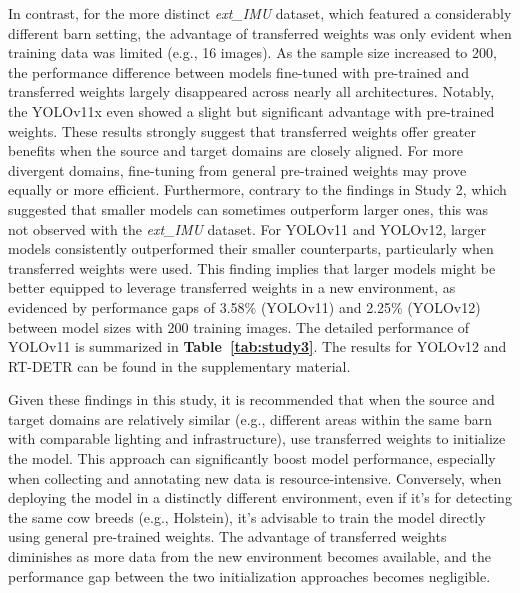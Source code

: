 In contrast, for the more distinct \textit{ext\_IMU} dataset, which featured a considerably different barn setting, the advantage of transferred weights was only evident when training data was limited (e.g., 16 images). As the sample size increased to 200, the performance difference between models fine-tuned with pre-trained and transferred weights largely disappeared across nearly all architectures. Notably, the YOLOv11x even showed a slight but significant advantage with pre-trained weights. These results strongly suggest that transferred weights offer greater benefits when the source and target domains are closely aligned. For more divergent domains, fine-tuning from general pre-trained weights may prove equally or more efficient. Furthermore, contrary to the findings in Study 2, which suggested that smaller models can sometimes outperform larger ones, this was not observed with the \textit{ext\_IMU} dataset. For YOLOv11 and YOLOv12, larger models consistently outperformed their smaller counterparts, particularly when transferred weights were used. This finding implies that larger models might be better equipped to leverage transferred weights in a new environment, as evidenced by performance gaps of 3.58\% (YOLOv11) and 2.25\% (YOLOv12) between model sizes with 200 training images. The detailed performance of YOLOv11 is summarized in \textbf{Table~\ref{tab:study3}}. The results for YOLOv12 and RT-DETR can be found in the supplementary material.

Given these findings in this study, it is recommended that when the source and target domains are relatively similar (e.g., different areas within the same barn with comparable lighting and infrastructure), use transferred weights to initialize the model. This approach can significantly boost model performance, especially when collecting and annotating new data is resource-intensive. Conversely, when deploying the model in a distinctly different environment, even if it's for detecting the same cow breeds (e.g., Holstein), it's advisable to train the model directly using general pre-trained weights. The advantage of transferred weights diminishes as more data from the new environment becomes available, and the performance gap between the two initialization approaches becomes negligible.

